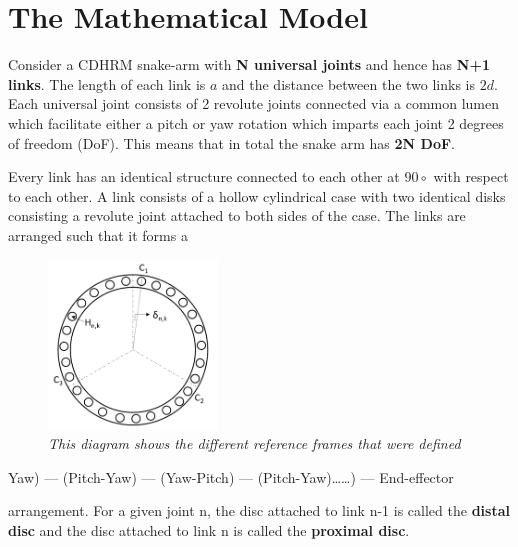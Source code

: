 \documentclass[a4paper,12pt]{report}
\begin{document}
\section{The Mathematical Model}
Consider a CDHRM snake-arm with \textbf{N universal joints} and hence has \textbf{N+1 links}. The length of each link is $a$ and the distance between the two links is $2d$. Each universal joint consists of 2 revolute joints connected via a common lumen which facilitate either a pitch or yaw rotation which imparts each joint 2 degrees of freedom (DoF). This means that in total the snake arm has \textbf{2N DoF}. 

Every link has an identical structure connected to each other at $90\circ$ with respect to each other. A link consists of a hollow cylindrical case with two identical disks consisting a revolute joint attached to both sides of the case. The links are arranged such that it forms a
\begin{figure}
	\centering
	\includegraphics[width=0.4\textwidth]{images/hole_positions.png}
	\caption{\textit{This diagram shows the different reference frames that were defined}}
	\label{hole-pos}
\end{figure} 
\begin{center}
	Yaw) --- (Pitch-Yaw) --- (Yaw-Pitch) --- (Pitch-Yaw)\ldots\ldots) --- End-effector
\end{center} 
arrangement. For a given joint n, the disc attached to link n-1 is called the \textbf{distal disc} and the disc attached to link n is called the \textbf{proximal disc}. 
\end{document}
